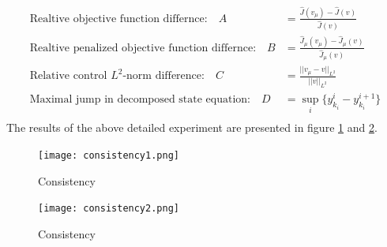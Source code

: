 \begin{align*}
\textrm{Realtive objective function differnce:}\quad A &= \frac{\hat{J}(v_{\mu})-\hat{J}(v)}{\hat{J}(v)}\\
\textrm{Realtive penalized objective function differnce:}\quad B &= \frac{\hat{J}_{\mu}(v_{\mu})-\hat{J}_{\mu}(v)}{\hat{J}_{\mu}(v)}\\
\textrm{Relative control $L^2$-norm difference:}\quad C&=\frac{||v_{\mu}-v||_ {L^2}}{||v||_{L^2}} \\
\textrm{Maximal jump in decomposed state equation:}\quad D&= \sup_i\{y_{k_i}^i-y_{k_i}^{i+1}\}\\
\end{align*}
The results of the above detailed experiment are presented in figure \ref{Cons1_fig} and \ref{Cons2_fig}.
\begin{figure}[h]
\centering
\texttt{[image: consistency1.png]}
\caption{Consistency}
\label{Cons1_fig}
\end{figure}
\begin{figure}[h]
\centering
\texttt{[image: consistency2.png]}
\caption{Consistency}
\label{Cons2_fig}
\end{figure}
